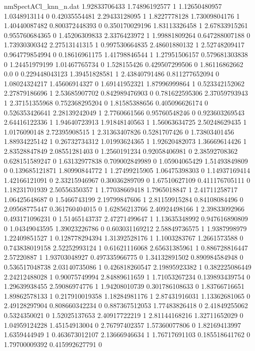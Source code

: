 \begin{filecontents}{nmSpectACl_knn_n.dat}
1.92833706433 1.74896192577 1
1.12650480957 1.0348913114 0
0.42035554481 2.29433128095 1
1.8227778128 1.73009804176 1
1.40440087482 0.800372448393 0
0.350170029196 1.83113326458 1
2.67833915261 0.955760684365 0
1.45206309833 2.3376423972 1
1.99881809264 0.647288007188 0
1.73930300342 2.27513141315 1
0.997530664835 2.48601880132 1
2.52748209417 0.964779854994 0
0.18616961175 1.41798846544 1
1.27951506157 0.579681303838 0
1.24451979199 1.01467765734 0
1.528155426 0.429507299506 0
1.86116862662 0.0 0
0.229448043123 1.39451828581 1
2.43840791486 0.811277652094 0
1.08024324217 1.45606914327 0
1.69141952321 1.87996999864 1
0.523342152062 2.27879186696 1
2.53685907702 0.842989476903 0
0.781622595306 2.37059793943 1
2.37151355968 0.752368295204 0
1.81585388656 0.405096626174 0
0.526353426641 2.28139242049 1
2.7760661566 0.95760548246 0
0.923603269543 2.64416122336 1
1.94640723913 1.91848140563 1
1.56063634725 2.50248629435 1
1.0176090148 2.72395908515 1
2.31363407826 0.5281707426 0
1.73803401456 1.88934225142 1
0.26732734312 1.01993624365 1
1.92620482073 1.36669614426 1
2.83528847849 2.08551281403 0
1.2560191234 0.92058406981 0
2.38592708362 0.628151589247 0
1.63132977838 0.709002849989 0
1.05904065429 1.51493849809 0
0.139685121871 1.80990844772 1
1.27499215905 1.06475398303 0
1.14937169414 1.42166121091 0
2.33215946967 0.30036289709 0
1.67510627109 0.411176705111 0
1.18231701939 2.50556350357 1
1.77038669418 1.7965018847 1
2.41711258717 1.06425648687 0
1.5466743199 2.19799847606 1
2.81159915284 0.84108084496 0
2.09568775447 0.361760404015 0
1.62856213766 2.40924498166 1
2.39833092966 0.493171096231 0
1.51465143737 2.47271499647 1
1.13635348992 0.947616890809 0
1.04349043595 1.39023226786 0
0.603031169212 2.58849736575 1
1.9387998979 1.22409851527 1
0.128778294394 1.31392528176 1
1.1003283767 1.2661573588 0
0.743838019158 2.52252993124 1
0.61621116068 2.65631385961 1
0.886728816447 2.57220887 1
1.93703048927 0.497335966775 0
1.34132891502 0.890984584948 0
0.536517048738 2.03140735086 1
0.426818260547 2.19895923382 1
0.382225086449 2.24212488028 1
0.90075749994 2.84889611659 1
1.71053267234 0.139893439754 0
1.29639938455 2.59086974776 1
1.94208010739 0.301786108633 0
1.83766716651 1.89862578133 1
0.217910019358 1.18284981176 1
2.87431916031 1.13362681065 0
2.49128297904 0.808660342234 0
0.887367512053 1.77483826418 0
2.41849255062 0.5324350021 0
1.52025137653 2.40917722219 1
2.81144168216 1.32711652029 0
1.04959124228 1.45154913004 0
2.76797402357 1.57360077806 0
1.82169413997 1.6359444949 1
0.463673012107 2.13666946634 1
1.76717691103 0.185518641762 0
1.79700009392 0.415992627791 0

\end{filecontents}
